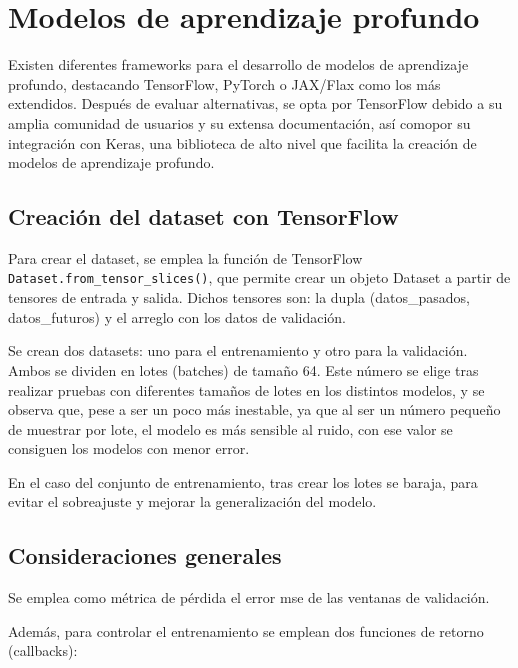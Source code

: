 \section{Modelos de aprendizaje profundo}
Existen diferentes frameworks para el desarrollo de modelos de aprendizaje profundo, destacando TensorFlow, PyTorch o JAX/Flax como los más extendidos.
Después de evaluar alternativas, se opta por TensorFlow debido a su amplia comunidad de usuarios y su extensa documentación, así comopor su integración con Keras, 
una biblioteca de alto nivel que facilita la creación de modelos de aprendizaje profundo.

\subsection{Creación del dataset con TensorFlow}
Para crear el dataset, se emplea la función de TensorFlow \texttt{Dataset.from\_tensor\_slices()}, que permite crear un objeto Dataset 
a partir de tensores de entrada y salida. Dichos tensores son: la dupla (datos\_pasados, datos\_futuros) y el arreglo con los datos de validación.

Se crean dos datasets: uno para el entrenamiento y otro para la validación. Ambos se dividen en lotes (batches) de tamaño 64. Este número se elige tras realizar 
pruebas con diferentes tamaños de lotes en los distintos modelos, y se observa que, pese a ser un poco más inestable, ya que al ser un número pequeño de muestrar por lote,
el modelo es más sensible al ruido, con ese valor se consiguen los modelos con menor error. 

En el caso del conjunto de entrenamiento, tras crear los lotes se baraja, para evitar el sobreajuste y mejorar la generalización del modelo.

\subsection{Consideraciones generales}
Se emplea como métrica de pérdida el error mse de las ventanas de validación.

Además, para controlar el entrenamiento se emplean dos funciones de retorno (callbacks): 

